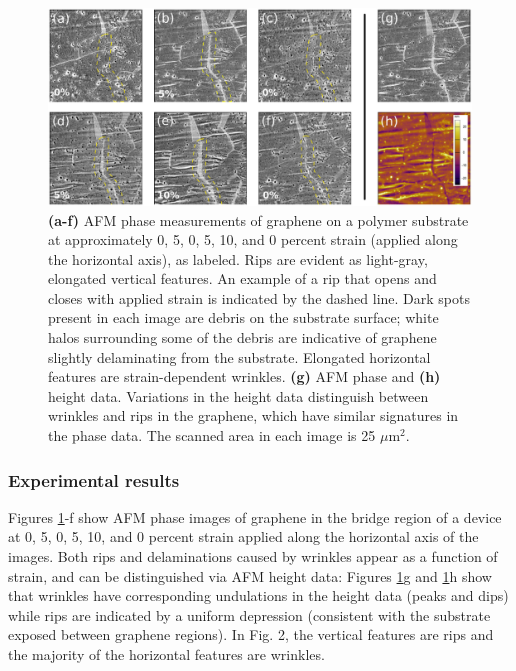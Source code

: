 \documentclass[edeposit,fullpage,draftthesis]{uiucthesis2009}
\begin{document}
        \begin{figure}
        \centering
        \includegraphics[width=\linewidth]{images/resultsanddiscussion/rippingpaper/Figure3.eps}
        \caption[AFM measurements of uniaxially strained graphene]
            {\textbf{(a-f)} AFM phase measurements of graphene on a polymer
            substrate at approximately 0, 5, 0, 5, 10, and 0 percent strain (applied along
            the horizontal axis), as labeled. Rips are evident as light-gray, elongated
            vertical features. An example of a rip that opens and closes with applied
            strain is indicated by the dashed line. Dark spots present in each image are
            debris on the substrate surface; white halos surrounding some of the debris are
            indicative of graphene slightly delaminating from the substrate. Elongated
            horizontal features are strain-dependent wrinkles. \textbf{(g)} AFM phase and
            \textbf{(h)} height data. Variations in the height data distinguish between
            wrinkles and rips in the graphene, which have similar signatures in the phase
            data. The scanned area in each image is 25 $\mu$m$^2$.}
        \label{fig:rip-afm}
        \end{figure}
   
        \subsubsection*{Experimental results}
        
        Figures \ref{fig:rip-afm}-f show AFM phase images of graphene in the bridge region of a device
        at 0, 5, 0, 5, 10, and 0 percent strain applied along the horizontal axis of
        the images. Both rips and delaminations caused by wrinkles appear as a function
        of strain, and can be distinguished via AFM height data: Figures \ref{fig:rip-afm}g and \ref{fig:rip-afm}h show
        that wrinkles have corresponding undulations in the height data (peaks and
        dips) while rips are indicated by a uniform depression (consistent with the
        substrate exposed between graphene regions). In Fig. 2, the vertical features
        are rips and the majority of the horizontal features are wrinkles.
        
\end{document}
